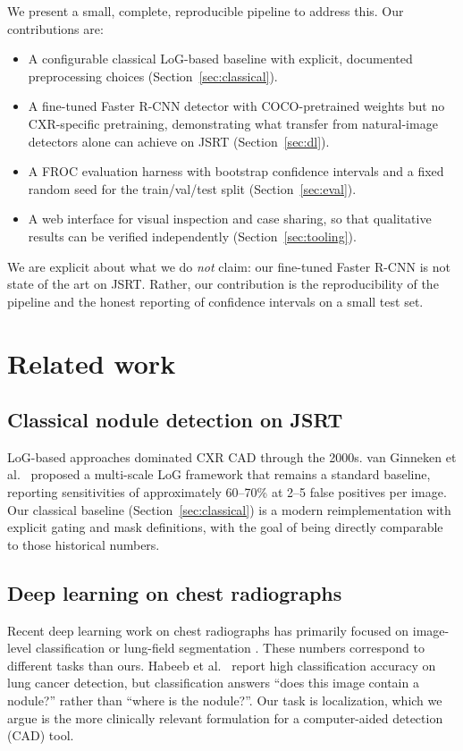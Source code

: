 \documentclass[11pt]{article}
\begin{document}
We present a small, complete, reproducible pipeline to address this. Our
contributions are:

\begin{itemize}
\item A configurable classical LoG-based baseline with explicit,
documented preprocessing choices (Section~\ref{sec:classical}).
\item A fine-tuned Faster R-CNN detector with COCO-pretrained weights but
no CXR-specific pretraining, demonstrating what transfer from natural-image
detectors alone can achieve on JSRT (Section~\ref{sec:dl}).
\item A FROC evaluation harness with bootstrap confidence intervals and a
fixed random seed for the train/val/test split (Section~\ref{sec:eval}).
\item A web interface for visual inspection and case sharing, so that
qualitative results can be verified independently
(Section~\ref{sec:tooling}).
\end{itemize}

We are explicit about what we do \textit{not} claim: our fine-tuned Faster
R-CNN is not state of the art on JSRT. Rather, our contribution is the
reproducibility of the pipeline and the honest reporting of confidence
intervals on a small test set.

\section{Related work}

\subsection{Classical nodule detection on JSRT}
LoG-based approaches dominated CXR CAD through the 2000s. van Ginneken et
al.~\cite{ginneken2001} proposed a multi-scale LoG framework that remains a
standard baseline, reporting sensitivities of approximately 60--70\% at 2--5
false positives per image. Our classical baseline (Section~\ref{sec:classical})
is a modern reimplementation with explicit gating and mask definitions, with
the goal of being directly comparable to those historical numbers.

\subsection{Deep learning on chest radiographs}

Recent deep learning work on chest radiographs has primarily focused on
image-level classification \cite{habeeb2025modified} or lung-field
segmentation \cite{thamilarasi2025enhanced}. These numbers correspond to
different tasks than ours. Habeeb et al.~\cite{habeeb2025modified} report
high classification accuracy on lung cancer detection, but classification
answers ``does this image contain a nodule?'' rather than ``where is the
nodule?''. Our task is localization, which we argue is the more clinically
relevant formulation for a computer-aided detection (CAD) tool.
\end{document}
